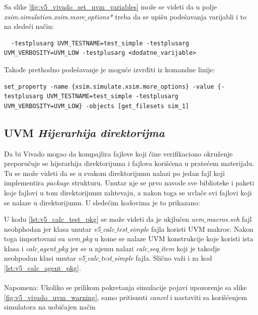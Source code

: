 Sa slike \ref{fig:v5_vivado_set_uvm_variables} može se videti da u polje \emph{xsim.simulation.xsim.more\(\_\)options*} treba da
se upišu podešavanja varijabli i to na sledeći način:
\begin{lstlisting}
  -testplusarg UVM_TESTNAME=test_simple -testplusarg UVM_VERBOSITY=UVM_LOW -testplusarg <dodatne_varijable>  
\end{lstlisting}

Takođe prethodno podešavanje je moguće izvrđiti iz komandne linije:
\begin{lstlisting}
set_property -name {xsim.simulate.xsim.more_options} -value {-testplusarg UVM_TESTNAME=test_simple -testplusarg UVM_VERBOSITY=UVM_LOW} -objects [get_filesets sim_1]
\end{lstlisting}

\subsection{UVM \emph{Hijerarhija direktorijma}}

Da bi Vivado mogao da kompajlira fajlove koji čine verifikaciono okruženje preporučuje se 
hijerarhija direktorijuma i fajlova korišćena u pratećem materijalu. Tu se može videti da
se u svakom direktorijumu nalazi po jedan fajl koji implementira \emph{package} strukturu.
Unutar nje se prvo navode sve biblioteke i paketi koje fajlovi u tom direktorijumu zahtevaju,
a nakon toga se uvlače svi fajlovi koji se nalaze u direktorijumu. U sledećim kodovima
je to prikazano:




U kodu \ref{lst:v5_calc_test_pkg} se može videti da je ukjlučen \emph{uvm\(\_\)macros.svh} fajl neohphodan
jer klasa unutar \emph{v5\(\_\)calc\(\_\)test\(\_\)simple} fajla koristi UVM makroe.
Nakon toga importovani su \emph{uvm\(\_\)pkg} u kome se nalaze UVM konstrukcije koje
koristi ista klasa i  \emph{calc\(\_\)agent\(\_\)pkg} jer se u njemu nalazi \emph{calc\(\_\)seq\(\_\)item} koji je
takodje neohpodan klasi unutar \emph{v5\(\_\)calc\(\_\)test\(\_\)simple} fajla. Slično važi i za kod \ref{lst:v5_calc_agent_pkg}.
\\
\\
Napomena: Ukoliko se prilikom pokretanja simulacije pojavi upozorenje sa slike \ref{fig:v5_vivado_uvm_warning}, samo pritisnuti \emph{cancel}
i nastaviti sa korišćenjem simulatora na uobičajen način

